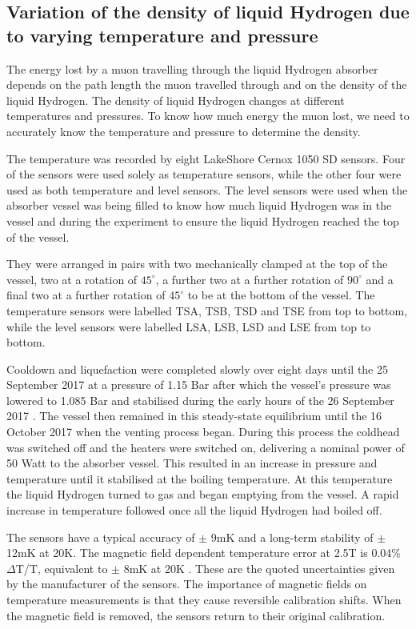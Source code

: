 \subsection{Variation of the density of liquid Hydrogen due to varying temperature and pressure}
\label{SubSect:Absorber_temperature}

 The energy lost by a muon travelling through the liquid Hydrogen absorber depends on the path length the
 muon travelled through and on the density of the liquid Hydrogen. The density of liquid Hydrogen changes
 at different temperatures and pressures. To know how much energy the muon lost, we need to accurately know
 the temperature and pressure to determine the density. 
 
 The temperature was recorded by eight LakeShore Cernox 1050 SD sensors. Four of the sensors
 were used solely as temperature sensors, while the other four were used as both temperature and level
 sensors. The level sensors were used when the absorber vessel was being filled to know how much liquid
 Hydrogen was in the vessel and during the experiment to ensure the liquid Hydrogen reached the top of the
 vessel. 

 They were arranged in pairs
 with two mechanically clamped at the
 top of the vessel, two at a rotation of ${45}^{\circ}$, a further two at a further rotation of
 ${90}^{\circ}$ and a final two at a further rotation of ${45}^{\circ}$ to be at the bottom of the vessel.
 The temperature sensors were labelled TSA, TSB, TSD and TSE from top to bottom, while the level sensors
 were labelled LSA, LSB, LSD and LSE from top to bottom.

Cooldown and liquefaction were completed slowly over eight days until the 25 September 2017 at a pressure of 1.15 Bar after which the vessel's pressure was lowered to 1.085 Bar and stabilised during the early hours of the 26 September 2017 \cite{1748-0221-13-09-T09008}. The vessel then remained in this steady-state equilibrium until the 16 October 2017 when the venting process began. During this process the coldhead was switched off and the heaters were switched on, delivering a nominal power of 50 Watt to the absorber vessel. This resulted in an increase in pressure and temperature until it stabilised at the boiling temperature. At this temperature the liquid Hydrogen turned to gas and began emptying from the vessel. A rapid increase in temperature followed once all the liquid Hydrogen had boiled off.

  The sensors have a typical accuracy of $\mathrm{\pm}$ 9mK and a long-term stability of
 $\mathrm{\pm}$ 12mK at 20K. The magnetic field dependent
 temperature error at 2.5T is 0.04\% $\Delta$T/T, equivalent to $\mathrm{\pm}$ 8mK at 20K
 \cite{CernoxRTDs} \cite{TemperatureMeasurement}. These are the quoted uncertainties given by the manufacturer
 of the sensors. The importance of magnetic fields on temperature measurements is that they cause
 reversible calibration shifts. When the magnetic field is removed, the sensors return to their original
 calibration.

